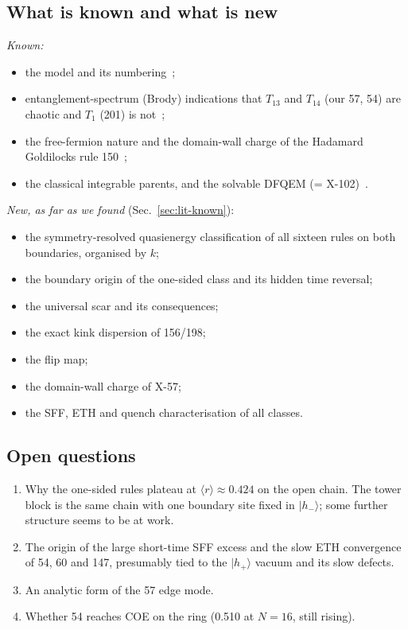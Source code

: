 \subsection{What is known and what is new}
\emph{Known:}
\begin{itemize}
\item the model and its numbering~\cite{hillberry2016,hillberry2021};
\item entanglement-spectrum (Brody) indications that $T_{13}$ and $T_{14}$ (our 57, 54) are chaotic and $T_1$ (201) is
  not~\cite{hillberry2021};
\item the free-fermion nature and the domain-wall charge of the Hadamard Goldilocks rule 150~\cite{hillberry2024};
\item the classical integrable parents, and the solvable DFQEM (= X-102)~\cite{buca2021,wilkinson2020,bertini2024det}.
\end{itemize}
\emph{New, as far as we found} (Sec.~\ref{sec:lit-known}):
\begin{itemize}
\item the symmetry-resolved quasienergy classification of all sixteen rules on both boundaries, organised by $k$;
\item the boundary origin of the one-sided class and its hidden time reversal;
\item the universal scar and its consequences;
\item the exact kink dispersion of 156/198;
\item the flip map;
\item the domain-wall charge of X-57;
\item the SFF, ETH and quench characterisation of all classes.
\end{itemize}

\subsection{Open questions}
\begin{enumerate}
\item Why the one-sided rules plateau at $\langle r\rangle\approx0.424$ on the open chain. The tower block is the same
  chain with one boundary site fixed in $|h_-\rangle$; some further structure seems to be at work.
\item The origin of the large short-time SFF excess and the slow ETH convergence of 54, 60 and 147, presumably tied to
  the $|h_+\rangle$ vacuum and its slow defects.
\item An analytic form of the 57 edge mode.
\item Whether 54 reaches COE on the ring (0.510 at $N=16$, still rising).
\end{enumerate}

